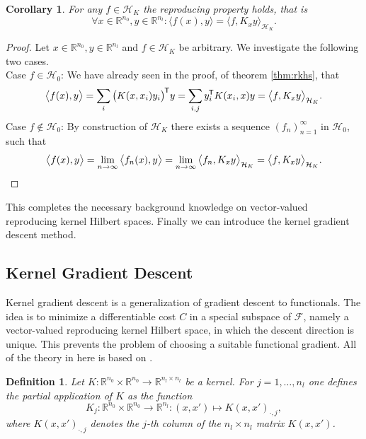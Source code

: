 \documentclass[11pt, a4paper]{article}
\newtheorem{corollary}[theorem]{Corollary}
\newtheorem{definition}[theorem]{Definition}
\newcommand{\R}{\mathbb{R}}
\newcommand{\F}{\mathcal{F}}
\renewcommand{\H}{\mathcal{H}}
\newcommand*{\tr}{^{\mkern-1.5mu\mathsf{T}}}
\begin{document}
\begin{corollary}
For any $f \in \H_K$ the reproducing property holds, that is
\[ \forall x \in \R^{n_0}, y \in \R^{n_l} : \big \langle f(x), y \big \rangle = \big \langle f, K_xy \big \rangle_{\H_K}. \]
\end{corollary}

\begin{proof}
Let $x \in \R^{n_0}, y \in \R^{n_l}$ and $f \in \H_K$ be arbitrary. We investigate the following two cases. \\

Case $f \in \H_0$: We have already seen in the proof, of theorem \ref{thm:rkhs}, that
\[ \big \langle f(x), y \big \rangle = \sum_{i} \big ( K(x,x_i)y_i \big ) \tr y = \sum_{i,j} y_i \tr K(x_i,x)y = \big \langle f, K_xy \big \rangle_{\H_K}. \]
Case $f \notin \H_0$: By construction of $\H_K$ there exists a sequence $(f_n)_{n=1}^{\infty}$ in $\H_0$, such that
\[ \big \langle f(x),y \big \rangle = \lim_{n \to \infty} \big \langle f_n(x),y \big \rangle = \lim_{n \to \infty} \big \langle f_n, K_xy \big \rangle_{\H_K} = \big \langle f, K_xy \big \rangle_{\H_K}. \qedhere \]
\end{proof}

This completes the necessary background knowledge on vector-valued reproducing kernel Hilbert spaces. Finally we can introduce the kernel gradient descent method.

\subsection{Kernel Gradient Descent} \label{sec:KGD}

Kernel gradient descent is a generalization of gradient descent to functionals. The idea is to minimize a differentiable cost $C$ in a special subspace of $\F$, namely a vector-valued reproducing kernel Hilbert space, in which the descent direction is unique. This prevents the problem of choosing a suitable functional gradient.
All of the theory in here is based on \cite{NTK}.

\begin{definition}
Let $K: \R^{n_0} \times \R^{n_0} \to \R^{n_l \times n_l}$ be a kernel. For $j=1, \dots, n_l$ one defines the partial application of $K$ as the function
\[ K_j : \R^{n_0} \times \R^{n_0} \to \R^{n_l} : (x,x') \mapsto K(x,x')_{\cdot,j}, \]
where $K(x,x')_{\cdot,j}$ denotes the $j$-th column of the $n_l \times n_l$ matrix $K(x,x')$.
\end{definition}
\end{document}
